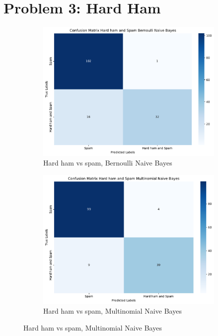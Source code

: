 \documentclass[a4paper]{article}
\begin{document}
\newpage
\section*{Problem 3: Hard Ham}

\begin{figure}
  \centering
  \begin{subfigure}[a]{\textwidth}
      \centering
      \includegraphics[width=\textwidth]{hard_ham_and_spam_bernoulli_naive_bayes_confusion_matrix.pdf}
      \caption{Hard ham vs spam, Bernoulli Naive Bayes}
      \label{fig:hard_ham_and_spam_bernoulli_naive_bayes_confusion_matrix}
  \end{subfigure}
  \vfill
  \begin{subfigure}[b]{\textwidth}
      \centering
      \includegraphics[width=\textwidth]{hard_ham_and_spam_multinomial_naive_bayes_confusion_matrix.pdf}
      \caption{Hard ham vs spam, Multinomial Naive Bayes}
      \label{fig:hard_ham_and_spam_multinomial_naive_bayes_confusion_matrix}
  \end{subfigure}
\end{figure}
\end{document}
